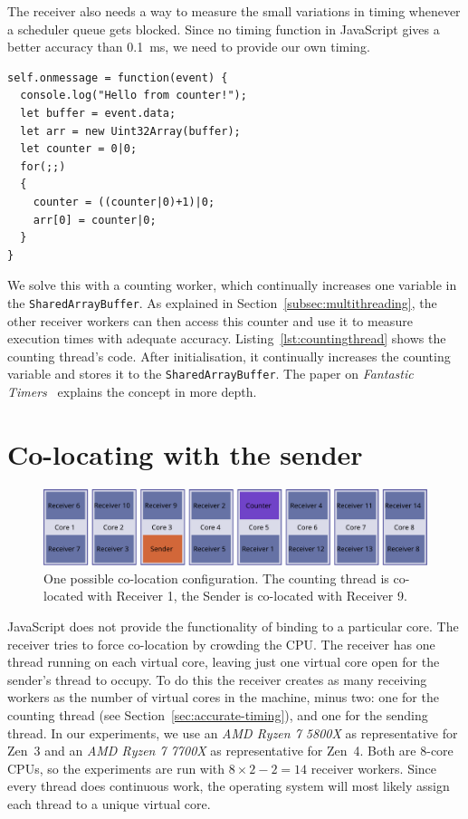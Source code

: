 \documentclass[11pt,
  titlepage=false,
  parskip=half,      %
]{scrreprt}
\begin{document}
The receiver also needs a way to measure the small variations in timing whenever a scheduler queue gets blocked.
Since no timing function in JavaScript gives a better accuracy than 0.1~ms, we need to provide our own timing.


\begin{lstlisting}[float,caption={The code for the counting thread},label={lst:countingthread}]
self.onmessage = function(event) {
  console.log("Hello from counter!");
  let buffer = event.data;
  let arr = new Uint32Array(buffer);
  let counter = 0|0;
  for(;;)
  {
    counter = ((counter|0)+1)|0;
    arr[0] = counter|0;
  }
}
\end{lstlisting}

We solve this with a counting worker, which continually increases one variable in the \texttt{SharedArrayBuffer}.
As explained in Section~\ref{subsec:multithreading}, the other receiver workers can then access this counter and use it to measure execution times with adequate accuracy.
Listing~\ref{lst:countingthread} shows the counting thread's code.
After initialisation, it continually increases the counting variable and stores it to the \texttt{SharedArrayBuffer}.
The paper on \textit{Fantastic Timers}~\cite{Schwarz2017Timers} explains the concept in more depth.

\section{Co-locating with the sender}
\label{sec:co-location}

\begin{figure}
\centering
\includegraphics[width=\textwidth]{figures/colocation}

\caption{One possible co-location configuration. The counting thread is co-located with Receiver 1, the Sender is co-located with Receiver 9.}
\label{fig:colocation}

\end{figure}

JavaScript does not provide the functionality of binding to a particular core.
The receiver tries to force co-location by crowding the CPU.
The receiver has one thread running on each virtual core,
leaving just one virtual core open for the sender's thread to occupy.
To do this the receiver creates as many receiving workers as the number of virtual cores in the machine, minus two:
one for the counting thread (see Section~\ref{sec:accurate-timing}), and one for the sending thread.
In our experiments, we use an \textit{AMD Ryzen 7 5800X} as representative for Zen~3 and an \textit{AMD Ryzen 7 7700X} as representative for Zen~4.
Both are 8-core CPUs, so the experiments are run with $8 \times 2 - 2 = 14$ receiver workers.
Since every thread does continuous work, the operating system will most likely assign each thread to a unique virtual core.
\end{document}
